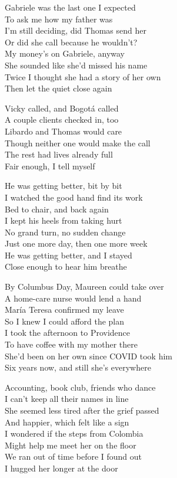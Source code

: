 \begin{lyrics}
Gabriele was the last one I expected\\
To ask me how my father was\\
I’m still deciding, did Thomas send her\\
Or did she call because he wouldn’t?\\
My money’s on Gabriele, anyway\\
She sounded like she’d missed his name\\
Twice I thought she had a story of her own\\
Then let the quiet close again

Vicky called, and Bogotá called\\
A couple clients checked in, too\\
Libardo and Thomas would care\\
Though neither one would make the call\\
The rest had lives already full\\
Fair enough, I tell myself

He was getting better, bit by bit\\
I watched the good hand find its work\\
Bed to chair, and back again\\
I kept his heels from taking hurt\\
No grand turn, no sudden change\\
Just one more day, then one more week\\
He was getting better, and I stayed\\
Close enough to hear him breathe

By Columbus Day, Maureen could take over\\
A home-care nurse would lend a hand\\
María Teresa confirmed my leave\\
So I knew I could afford the plan\\
I took the afternoon to Providence\\
To have coffee with my mother there\\
She’d been on her own since COVID took him\\
Six years now, and still she’s everywhere

Accounting, book club, friends who dance\\
I can’t keep all their names in line\\
She seemed less tired after the grief passed\\
And happier, which felt like a sign\\
I wondered if the steps from Colombia\\
Might help me meet her on the floor\\
We ran out of time before I found out\\
I hugged her longer at the door


\end{lyrics}
